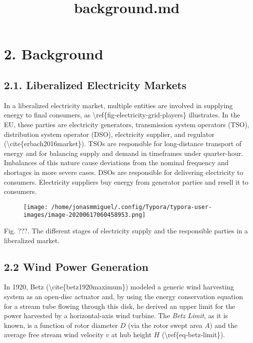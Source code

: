 \documentclass[
]{article}
\title{background.md}
\author{}
\date{}
\begin{document}
\maketitle

\hypertarget{header-n0}{%
\section{2. Background}\label{header-n0}}

\hypertarget{header-n2}{%
\subsection{2.1. Liberalized Electricity Markets}\label{header-n2}}

In a liberalized electricity market, multiple entities are involved in
supplying energy to final consumers, as
\textbackslash ref\{fig-electricity-grid-players\} illustrates. In the
EU, these parties are electricity generators, transmission system
operators (TSO), distribution system operator (DSO), electricity
supplier, and regulator (\textbackslash cite\{erbach2016market\}). TSOs
are responsible for long-distance transport of energy and for balancing
supply and demand in timeframes under quarter-hour. Imbalances of this
nature cause deviations from the nominal frequency and shortages in more
severe cases. DSOs are responsible for delivering electricity to
consumers. Electricity suppliers buy energy from generator parties and
resell it to consumers.

\begin{figure}
\centering
\texttt{[image: /home/jonasmmiguel/.config/Typora/typora-user-images/image-20200617060458953.png]}
\caption{}
\end{figure}

Fig. ???. The different stages of electricity supply and the responsible
parties in a liberalized market.

\hypertarget{header-n6}{%
\subsection{2.2 Wind Power Generation}\label{header-n6}}

In 1920, Betz (\textbackslash cite\{betz1920maximum\}) modeled a generic
wind harvesting system as an open-disc actuator and, by using the energy
conservation equation for a stream tube flowing through this disk, he
derived an upper limit for the power harvested by a horizontal-axis wind
turbine. The \emph{Betz Limit}, as it is known, is a function of rotor
diameter \(D\) (via the rotor swept area \(A\)) and the average free
stream wind velocity \(v\) at hub height \(H\)
(\textbackslash ref\{eq-betz-limit\}).
\end{document}
